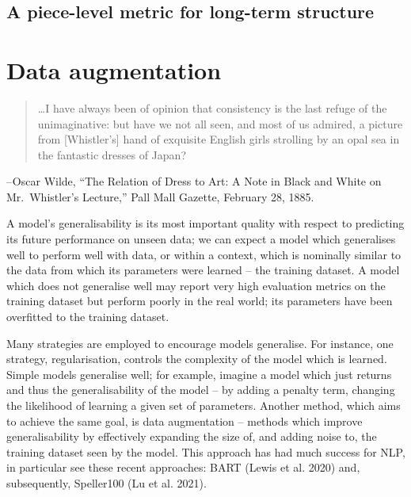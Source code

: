 \documentclass[12pt,a4paper,]{report}
\begin{document}
\hypertarget{a-piece-level-metric-for-long-term-structure}{%
\section{A piece-level metric for long-term
structure}\label{a-piece-level-metric-for-long-term-structure}}

\hypertarget{data-augmentation}{%
\chapter{Data augmentation}\label{data-augmentation}}

\begin{quote}
\ldots I have always been of opinion that consistency is the last refuge
of the unimaginative: but have we not all seen, and most of us admired,
a picture from {[}Whistler's{]} hand of exquisite English girls
strolling by an opal sea in the fantastic dresses of Japan?
\end{quote}

-- Oscar Wilde, ``The Relation of Dress to Art: A Note in Black and
White on Mr.~Whistler's Lecture,'' Pall Mall Gazette, February 28, 1885.

A model's generalisability is its most important quality with respect to
predicting its future performance on unseen data; we can expect a model
which generalises well to perform well with data, or within a context,
which is nominally similar to the data from which its parameters were
learned -- the training dataset. A model which does not generalise well
may report very high evaluation metrics on the training dataset but
perform poorly in the real world; its parameters have been overfitted to
the training dataset.

Many strategies are employed to encourage models generalise. For
instance, one strategy, regularisation, controls the complexity of the
model which is learned. Simple models generalise well; for example,
imagine a model which just returns and thus the generalisability of the
model -- by adding a penalty term, changing the likelihood of learning a
given set of parameters. Another method, which aims to achieve the same
goal, is data augmentation -- methods which improve generalisability by
effectively expanding the size of, and adding noise to, the training
dataset seen by the model. This approach has had much success for NLP,
in particular see these recent approaches: BART (Lewis et al. 2020) and,
subsequently, Speller100 (Lu et al. 2021).
\end{document}
